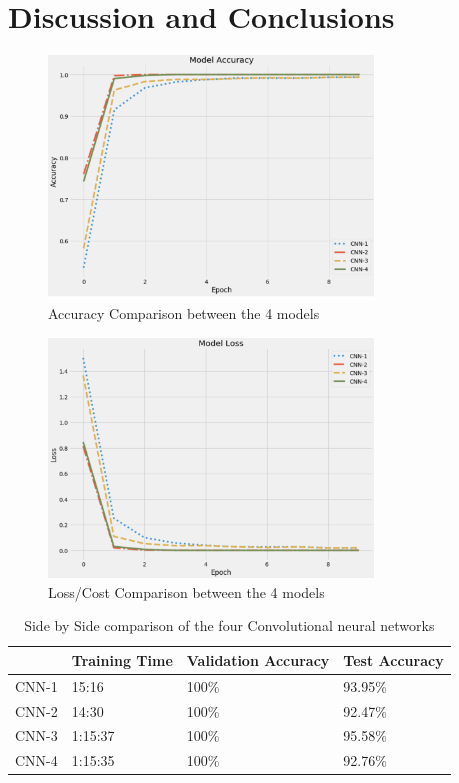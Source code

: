 \documentclass[5p,authoryear]{elsarticle}
\begin{document}
\section{Discussion and Conclusions}


\begin{figure}[!htb] \centering
	\includegraphics[width=3.4in]{figures/Model-Accuracy-Evaluation.png}
	\caption[]{Accuracy Comparison between the 4 models} 
	\label{Accuracy} 
\end{figure}


\begin{figure}[!htb] \centering
	\includegraphics[width=3.4in]{figures/Model-Loss-Evaluation.png}
	\caption[]{Loss/Cost Comparison between the 4 models} 
	\label{Loss} 
\end{figure}


\begin{table}[!htb] 
  \centering 
  \begin{tabular}{@{\small}llll@{}} 
    \toprule %
    & {\footnotesize Training Time} &  {\footnotesize Validation Accuracy} & {\footnotesize Test Accuracy} \\ \midrule
    CNN-1 & 15:16 & 100\% & 93.95\% \\
    CNN-2 & 14:30 & 100\% & 92.47\% \\
    CNN-3 & 1:15:37 & 100\% & 95.58\% \\
    CNN-4 & 1:15:35 & 100\% & 92.76\% \\ 
    \bottomrule
\end{tabular} \caption{Side by Side comparison of the four Convolutional neural networks} \label{table_eval}
\end{table}
\end{document}
